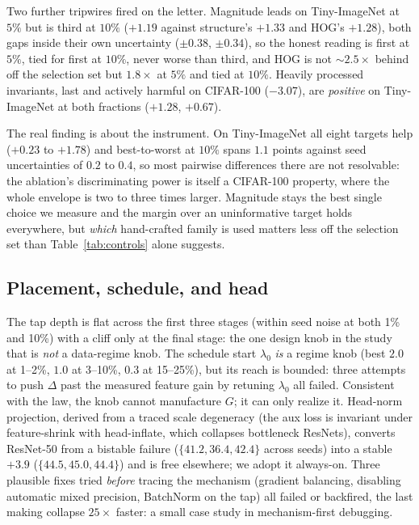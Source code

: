 Two further tripwires fired on the letter. Magnitude leads on Tiny-ImageNet at
$5\%$ but is third at $10\%$ ($+1.19$ against structure's $+1.33$ and HOG's
$+1.28$), both gaps inside their own uncertainty ($\pm 0.38$, $\pm 0.34$), so
the honest
reading is first at $5\%$, tied for first at $10\%$, never worse than third,
and HOG is not ${\sim}2.5\times$ behind off the selection set but $1.8\times$
at $5\%$ and tied at $10\%$. Heavily processed invariants, last and actively
harmful on CIFAR-100 ($-3.07$), are \emph{positive} on Tiny-ImageNet at both
fractions ($+1.28$, $+0.67$).

The real finding is about the instrument. On Tiny-ImageNet all eight targets
help ($+0.23$ to $+1.78$) and best-to-worst at $10\%$ spans $1.1$ points
against seed uncertainties of $0.2$ to $0.4$, so most pairwise differences
there are not resolvable: the ablation's discriminating power is itself a
CIFAR-100 property, where the whole envelope is two to three times larger.
Magnitude stays the best single choice we measure and the margin over an
uninformative target holds everywhere, but \emph{which} hand-crafted family is
used matters less off the selection set than Table~\ref{tab:controls} alone
suggests.

\subsection{Placement, schedule, and head}\label{abl:placement}
The tap depth is flat across the first three stages (within seed noise at both
1\% and 10\%) with a cliff only at the final stage: the one design knob in the
study that is \emph{not} a data-regime knob. The schedule start $\lambda_0$
\emph{is} a regime knob (best $2.0$ at 1--2\%, $1.0$ at 3--10\%, $0.3$ at
15--25\%), but its reach is bounded: three attempts to push $\Delta$ past the
measured feature gain by retuning $\lambda_0$ all failed. Consistent with the
law, the knob cannot manufacture $G$; it can only realize it. Head-norm
projection, derived from a traced scale degeneracy (the aux loss is invariant
under feature-shrink with head-inflate, which collapses bottleneck ResNets),
converts ResNet-50 from a bistable failure ($\{41.2, 36.4, 42.4\}$ across
seeds) into a stable $+3.9$ ($\{44.5, 45.0, 44.4\}$) and is free elsewhere; we
adopt it always-on. Three plausible fixes tried \emph{before} tracing the
mechanism (gradient balancing, disabling automatic mixed precision, BatchNorm
on the tap) all failed or backfired, the last making collapse $25\times$
faster: a small case study in mechanism-first debugging.


